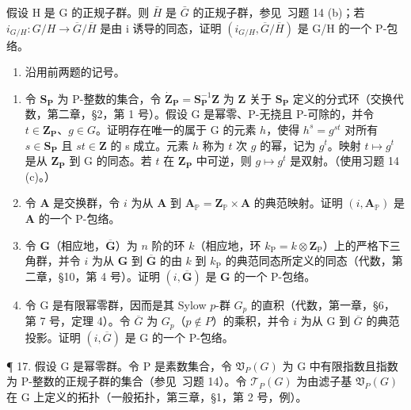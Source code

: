假设 H 是 G 的正规子群。则 \(\bar{H}\) 是 \(\bar{G}\) 的正规子群，参见~习题 14 (b)；若 \(i_{G/H}: G/H \to \overline{G}/\overline{H}\) 是由 i 诱导的同态，证明 \((i_{G/H}, \overline{G}/\overline{H})\) 是 G/H 的一个 P-包络。

\begin{enumerate}
\def\labelenumi{\arabic{enumi}.}
\setcounter{enumi}{15}
\tightlist
\item
  沿用前两题的记号。
\end{enumerate}

\begin{enumerate}
\def\labelenumi{(\alph{enumi})}
\item
  令 \(\mathbf{S}_{\mathbf{P}}\) 为 P-整数的集合，令 \(\mathbf{\dot{Z}}_{\mathbf{P}} = \mathbf{S}_{\mathbf{P}}^{-1}\mathbf{Z}\) 为 \(\mathbf{Z}\) 关于 \(\mathbf{S}_{\mathbf{P}}\) 定义的分式环（交换代数，第二章，§2，第 1 号）。假设 G 是幂零、P-无挠且 P-可除的，并令 \(t \in \mathbf{Z}_{\mathbf{P}}\)、\(g \in G\)。证明存在唯一的属于 G 的元素 \(h\)，使得 \(h^s = g^{st}\) 对所有 \(s \in \mathbf{S}_{\mathbf{P}}\) 且 \(st \in \mathbf{Z}\) 的 s 成立。元素 \(h\) 称为 \(t\) 次 \(g\) 的幂，记为 \(g^t\)。映射 \(t \mapsto g^t\) 是从 \(\mathbf{Z}_{\mathbf{P}}\) 到 G 的同态。若 \(t\) 在 \(\mathbf{Z}_{\mathbf{P}}\) 中可逆，则 \(g \mapsto g^t\) 是双射。（使用习题 14 (c)。）
\item
  令 \(\mathbf{A}\) 是交换群，令 \(i\) 为从 \(\mathbf{A}\) 到 \(\mathbf{A}_{\mathbb{P}} = \mathbf{Z}_{\mathbb{P}} \times \mathbf{A}\) 的典范映射。证明 \((i, \mathbf{A}_{\mathbb{P}})\) 是 \(\mathbf{A}\) 的一个 P-包络。
\item
  令 \(\mathbf{G}\)（相应地，\(\overline{\mathbf{G}}\)）为 \(n\) 阶的环 \(k\)（相应地，环 \(k_{\mathrm{P}} = k\otimes \mathbf{Z}_{\mathrm{P}}\)）上的严格下三角群，并令 \(i\) 为从 \(\mathbf{G}\) 到 \(\overline{\mathbf{G}}\) 的由 \(k\) 到 \(k_{\mathrm{P}}\) 的典范同态所定义的同态（代数，第二章，§10，第 4 号）。证明 \((i,\overline{\mathbf{G}})\) 是 \(\mathbf{G}\) 的一个 P-包络。
\item
  令 G 是有限幂零群，因而是其 Sylow \(p\)-群 \(G_p\) 的直积（代数，第一章，§6，第 7 号，定理 4）。令 \(\overline{G}\) 为 \(G_p\)（\(p \notin P\)）的乘积，并令 \(i\) 为从 G 到 \(\overline{G}\) 的典范投影。证明 \((i, \overline{G})\) 是 G 的一个 P-包络。
\end{enumerate}

¶ 17. 假设 G 是幂零群。令 P 是素数集合，令 \(\mathfrak{V}_{P}(G)\) 为 G 中有限指数且指数为 P-整数的正规子群的集合（参见~习题 14）。令 \(\mathcal{T}_{P}(G)\) 为由滤子基 \(\mathfrak{V}_{P}(G)\) 在 G 上定义的拓扑（一般拓扑，第三章，§1，第 2 号，例）。

